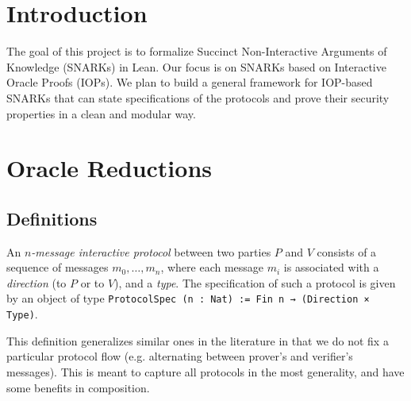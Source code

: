 %

\chapter{Introduction}

The goal of this project is to formalize Succinct Non-Interactive Arguments of Knowledge (SNARKs) in Lean. Our focus is on SNARKs based on Interactive Oracle Proofs (IOPs). We plan to build a general framework for IOP-based SNARKs that can state specifications of the protocols and prove their security properties in a clean and modular way.

\chapter{Oracle Reductions}

\section{Definitions}

\begin{definition}
    \label{def:interactive_protocol_type_signature}
    An \emph{$n$-message interactive protocol} between two parties $P$ and $V$ consists of a sequence of messages $m_0, \dots, m_n$, where each message $m_i$ is associated with a \emph{direction} (to $P$ or to $V$), and a \emph{type}. The specification of such a protocol is given by an object of type \verb|ProtocolSpec (n : Nat) := Fin n → (Direction × Type)|.

    This definition generalizes similar ones in the literature in that we do not fix a particular protocol flow (e.g. alternating between prover's and verifier's messages). This is meant to capture all protocols in the most generality, and have some benefits in composition.
\end{definition}

